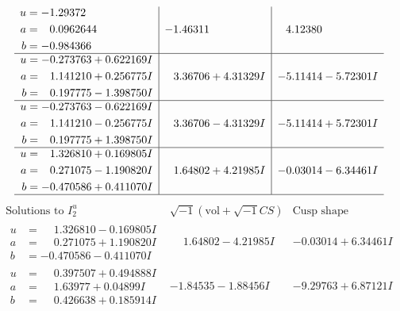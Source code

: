 \documentclass[1p]{elsarticle_modified}
\theoremstyle{definition}
\newcommand{\I}{\sqrt{-1}}
\begin{document}
$$\begin{array}{c|c|c}
\begin{aligned}
u &= -1.29372\phantom{ +0.000000I} \\
a &= \phantom{-}0.0962644\phantom{ +0.000000I} \\
b &= -0.984366\phantom{ +0.000000I}\end{aligned}
 & -1.46311\phantom{ +0.000000I} & \phantom{-}4.12380\phantom{ +0.000000I} \\ \hline\begin{aligned}
u &= -0.273763 + 0.622169 I \\
a &= \phantom{-}1.141210 + 0.256775 I \\
b &= \phantom{-}0.197775 - 1.398750 I\end{aligned}
 & \phantom{-}3.36706 + 4.31329 I & -5.11414 - 5.72301 I \\ \hline\begin{aligned}
u &= -0.273763 - 0.622169 I \\
a &= \phantom{-}1.141210 - 0.256775 I \\
b &= \phantom{-}0.197775 + 1.398750 I\end{aligned}
 & \phantom{-}3.36706 - 4.31329 I & -5.11414 + 5.72301 I \\ \hline\begin{aligned}
u &= \phantom{-}1.326810 + 0.169805 I \\
a &= \phantom{-}0.271075 - 1.190820 I \\
b &= -0.470586 + 0.411070 I\end{aligned}
 & \phantom{-}1.64802 + 4.21985 I & -0.03014 - 6.34461 I\\
 \hline 
 \end{array}$$\newpage$$\begin{array}{c|c|c}  
\text{Solutions to }I^u_{2}& \I (\text{vol} + \sqrt{-1}CS) & \text{Cusp shape}\\
 \hline 
\begin{aligned}
u &= \phantom{-}1.326810 - 0.169805 I \\
a &= \phantom{-}0.271075 + 1.190820 I \\
b &= -0.470586 - 0.411070 I\end{aligned}
 & \phantom{-}1.64802 - 4.21985 I & -0.03014 + 6.34461 I \\ \hline\begin{aligned}
u &= \phantom{-}0.397507 + 0.494888 I \\
a &= \phantom{-}1.63977 + 0.04899 I \\
b &= \phantom{-}0.426638 + 0.185914 I\end{aligned}
 & -1.84535 - 1.88456 I & -9.29763 + 6.87121 I \\ \hline\begin{aligned}

\end{aligned}
\end{array}$$
\end{document}
